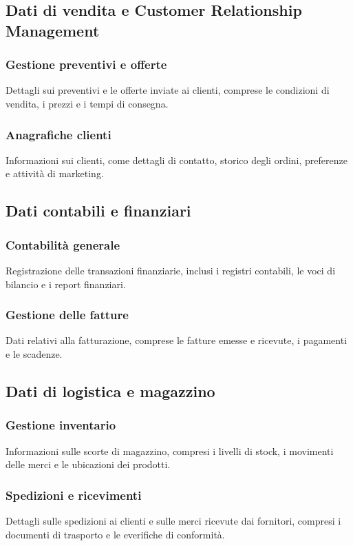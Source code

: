 \documentclass{article}
\begin{document}
\subsection{Dati di vendita e Customer Relationship Management}
\subsubsection{Gestione preventivi e offerte}
Dettagli sui preventivi e le offerte inviate ai clienti, comprese le condizioni di vendita, i prezzi e i tempi di consegna.
\subsubsection{Anagrafiche clienti}
Informazioni sui clienti, come dettagli di contatto, storico degli ordini, preferenze e attività di marketing.

\subsection{Dati contabili e finanziari}
\subsubsection{Contabilità generale}
Registrazione delle transazioni finanziarie, inclusi i registri contabili, le voci di bilancio e i report finanziari.
\subsubsection{Gestione delle fatture}
Dati relativi alla fatturazione, comprese le fatture emesse e ricevute, i pagamenti e le scadenze.

\subsection{Dati di logistica e magazzino}
\subsubsection{Gestione inventario}
Informazioni sulle scorte di magazzino, compresi i livelli di stock, i movimenti delle merci e le ubicazioni dei prodotti.
\subsubsection{Spedizioni e ricevimenti}
Dettagli sulle spedizioni ai clienti e sulle merci ricevute dai fornitori, compresi i documenti di trasporto e le everifiche di conformità.
\end{document}
